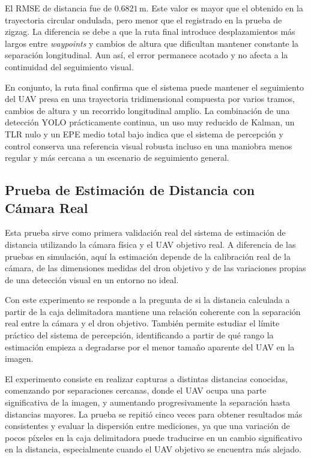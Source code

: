 \vspace{0.3cm}

El RMSE de distancia fue de $0.6821\,\mathrm{m}$. Este valor es mayor que el obtenido en la trayectoria circular ondulada, pero menor que el registrado en la prueba de zigzag. La diferencia se debe a que la ruta final introduce desplazamientos más largos entre \textit{waypoints} y cambios de altura que dificultan mantener constante la separación longitudinal. Aun así, el error permanece acotado y no afecta a la continuidad del seguimiento visual.

\vspace{0.3cm}

En conjunto, la ruta final confirma que el sistema puede mantener el seguimiento del UAV presa en una trayectoria tridimensional compuesta por varios tramos, cambios de altura y un recorrido longitudinal amplio. La combinación de una detección YOLO prácticamente continua, un uso muy reducido de Kalman, un TLR nulo y un EPE medio total bajo indica que el sistema de percepción y control conserva una referencia visual robusta incluso en una maniobra menos regular y más cercana a un escenario de seguimiento general.

\subsection{Prueba de Estimación de Distancia con Cámara Real}

Esta prueba sirve como primera validación real del sistema de estimación de distancia utilizando la cámara física y el UAV objetivo real. A diferencia de las pruebas en simulación, aquí la estimación depende de la calibración real de la cámara, de las dimensiones medidas del dron objetivo y de las variaciones propias de una detección visual en un entorno no ideal.

\vspace{0.3cm}

Con este experimento se responde a la pregunta de si la distancia calculada a partir de la caja delimitadora mantiene una relación coherente con la separación real entre la cámara y el dron objetivo. También permite estudiar el límite práctico del sistema de percepción, identificando a partir de qué rango la estimación empieza a degradarse por el menor tamaño aparente del UAV en la imagen.

\vspace{0.3cm}

El experimento consiste en realizar capturas a distintas distancias conocidas, comenzando por separaciones cercanas, donde el UAV ocupa una parte significativa de la imagen, y aumentando progresivamente la separación hasta distancias mayores. La prueba se repitió cinco veces para obtener resultados más consistentes y evaluar la dispersión entre mediciones, ya que una variación de pocos píxeles en la caja delimitadora puede traducirse en un cambio significativo en la distancia, especialmente cuando el UAV objetivo se encuentra más alejado.

